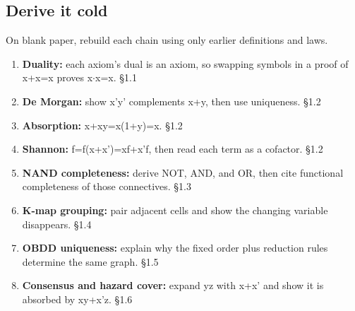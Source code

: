 \documentclass[11pt]{article}
\begin{document}
\begin{keepsection}
\section{Derive it cold}

On blank paper, rebuild each chain using only earlier definitions and laws.

\begin{enumerate}
\item \textbf{Duality:} each axiom’s dual is an axiom, so swapping symbols in a proof of x+x=x proves x\ensuremath{\cdot}x=x. \hfill{\small\color{FAUblue}§1.1}
\item \textbf{De Morgan:} show x'y' complements x+y, then use uniqueness. \hfill{\small\color{FAUblue}§1.2}
\item \textbf{Absorption:} x+xy=x(1+y)=x. \hfill{\small\color{FAUblue}§1.2}
\item \textbf{Shannon:} f=f(x+x')=xf+x'f, then read each term as a cofactor. \hfill{\small\color{FAUblue}§1.2}
\item \textbf{NAND completeness:} derive NOT, AND, and OR, then cite functional completeness of those connectives. \hfill{\small\color{FAUblue}§1.3}
\item \textbf{K-map grouping:} pair adjacent cells and show the changing variable disappears. \hfill{\small\color{FAUblue}§1.4}
\item \textbf{OBDD uniqueness:} explain why the fixed order plus reduction rules determine the same graph. \hfill{\small\color{FAUblue}§1.5}
\item \textbf{Consensus and hazard cover:} expand yz with x+x' and show it is absorbed by xy+x'z. \hfill{\small\color{FAUblue}§1.6}
\end{enumerate}
\end{keepsection}
\end{document}
